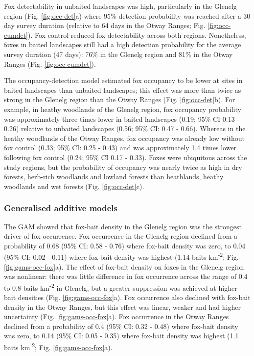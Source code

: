 \documentclass[11pt,a4paper,titlepage,twoside,openright]{style/unimelbthesis}
\begin{document}
\begin{mainmatter}
Fox detectability in unbaited landscapes was high, particularly in the Glenelg region (Fig. \ref{fig:occ-det}a) where 95\% detection probability was reached after a 30 day survey duration (relative to 64 days in the Otway Ranges; Fig. \ref{fig:occ-cumdet}). Fox control reduced fox detectability across both regions. Nonetheless, foxes in baited landscapes still had a high detection probability for the average survey duration (47 days): 76\% in the Glenelg region and 81\% in the Otway Ranges (Fig. \ref{fig:occ-cumdet}).

The occupancy-detection model estimated fox occupancy to be lower at sites in baited landscapes than unbaited landscapes; this effect was more than twice as strong in the Glenelg region than the Otway Ranges (Fig. \ref{fig:occ-det}b). For example, in heathy woodlands of the Glenelg region, fox occupancy probability was approximately three times lower in baited landscapes (0.19; 95\% CI 0.13 - 0.26) relative to unbaited landscapes (0.56; 95\% CI: 0.47 - 0.66). Whereas in the heathy woodlands of the Otway Ranges, fox occupancy was already low without fox control (0.33; 95\% CI: 0.25 - 0.43) and was approximately 1.4 times lower following fox control (0.24; 95\% CI 0.17 - 0.33). Foxes were ubiquitous across the study regions, but the probability of occupancy was nearly twice as high in dry forests, herb-rich woodlands and lowland forests than heathlands, heathy woodlands and wet forests (Fig. \ref{fig:occ-det}c).

\hypertarget{generalised-additive-models-1}{%
\subsubsection{Generalised additive models}\label{generalised-additive-models-1}}

The GAM showed that fox-bait density in the Glenelg region was the strongest driver of fox occurrence. Fox occurrence in the Glenelg region declined from a probability of 0.68 (95\% CI: 0.58 - 0.76) where fox-bait density was zero, to 0.04 (95\% CI: 0.02 - 0.11) where fox-bait density was highest (1.14 baits km\textsuperscript{-2}; Fig. \ref{fig:gams-occ-fox}a). The effect of fox-bait density on foxes in the Glenelg region was nonlinear: there was little difference in fox occurrence across the range of 0.4 to 0.8 baits km\textsuperscript{-2} in Glenelg, but a greater suppression was achieved at higher bait densities (Fig. \ref{fig:gams-occ-fox}a). Fox occurrence also declined with fox-bait density in the Otway Ranges, but this effect was linear, weaker and had higher uncertainty (Fig. \ref{fig:gams-occ-fox}a). Fox occurrence in the Otway Ranges declined from a probability of 0.4 (95\% CI: 0.32 - 0.48) where fox-bait density was zero, to 0.14 (95\% CI: 0.05 - 0.35) where fox-bait density was highest (1.1 baits km\textsuperscript{-2}; Fig. \ref{fig:gams-occ-fox}a).


\end{mainmatter}
\end{document}
